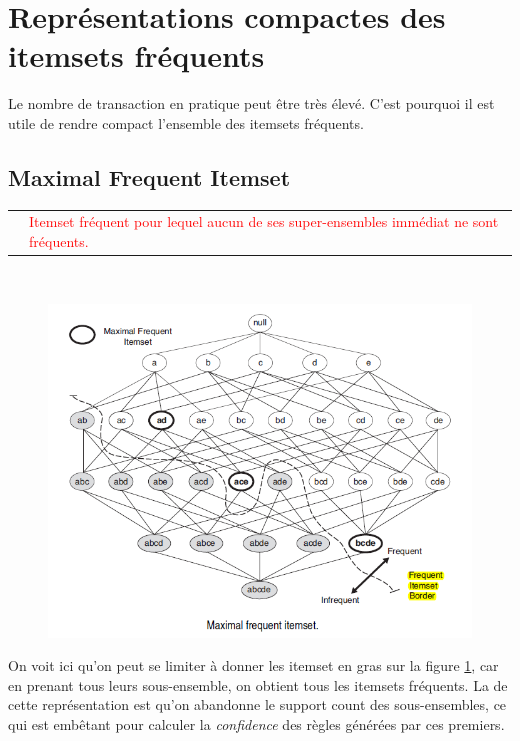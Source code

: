 \documentclass[letterpaper, 12pt]{article}
\newcommand{\alinea}{
\hspace*{0.5cm}}
\newcommand{\red}[1]{
	\textcolor{red}{#1}}
\newcommand{\myul}[1]{
		\underline{\smash{#1}}
	}
\begin{document}
	\section{Représentations compactes des itemsets fréquents}
		\alinea Le nombre de transaction en pratique peut être très élevé.
			C'est pourquoi il est utile de rendre compact l'ensemble
			des itemsets fréquents.
		\subsection{Maximal Frequent Itemset}
			\begin{tabular}{lp{10cm}}
				\myul{\textbf{\hl{Maximal Frequent Itemset}}} & 
					\red{Itemset fréquent pour lequel aucun de ses 
					super-ensembles immédiat ne sont fréquents.}
			\end{tabular}~\\
			\begin{figure}[H]
				\centering
				\includegraphics[scale=0.90]{Images/max_item_set.png}
				\caption{}
				\label{fig:max_it_set}
			\end{figure}\noindent
			\alinea On voit ici qu'on peut se limiter à donner les itemset
				en gras sur la figure \ref{fig:max_it_set}, car en prenant
				tous leurs sous-ensemble, on obtient tous les itemsets 
				fréquents. La \myul{\textbf{\hl{limitation}}} de cette
				représentation est qu'on
				abandonne le support count des sous-ensembles, ce qui
				est embêtant pour calculer la \textit{confidence} des
				règles générées par ces premiers.
\end{document}
